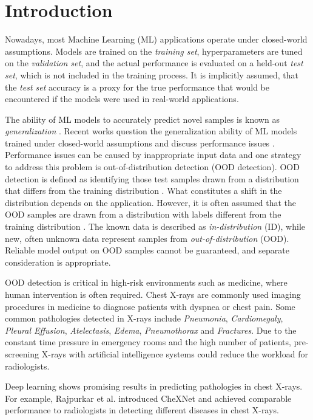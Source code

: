 \section{Introduction}
\raggedbottom
Nowadays, most Machine Learning (ML) applications operate under closed-world assumptions.
Models are trained on the \textit{training set}, hyperparameters are tuned on the \textit{validation set}, and the actual performance is evaluated on a held-out \textit{test set}, which is not included in the training process.
It is implicitly assumed, that the \textit{test set} accuracy is a proxy for the true performance that would be encountered if the models were used in real-world applications.
\par
The ability of ML models to accurately predict novel samples is known as \textit{generalization} \citep{Bishop2006}.
Recent works question the generalization ability of ML models trained under closed-world assumptions and discuss performance issues \citep{Recht2018,Zech2018}.
Performance issues can be caused by inappropriate input data and one strategy to address this problem is out-of-distribution detection (OOD detection).
OOD detection is defined as identifying those test samples drawn from a distribution that differs from the training distribution \citep{Yang2021}.
What constitutes a shift in the distribution depends on the application.
However, it is often assumed that the OOD samples are drawn from a distribution with labels different from the training distribution \citep{Yang2021}.
The known data is described as \textit{in-distribution} (ID), while new, often unknown data represent samples from \textit{out-of-distribution} (OOD).
Reliable model output on OOD samples cannot be guaranteed, and separate consideration is appropriate.
\par
OOD detection is critical in high-risk environments such as medicine, where human intervention is often required.
Chest X-rays are commonly used imaging procedures in medicine to diagnose patients with dyspnea or chest pain.
Some common pathologies detected in X-rays include \textit{Pneumonia}, \textit{Cardiomegaly}, \textit{Pleural Effusion}, \textit{Atelectasis}, \textit{Edema}, \textit{Pneumothorax} and \textit{Fractures}.
Due to the constant time pressure in emergency rooms and the high number of patients, pre-screening X-rays with artificial intelligence systems could reduce the workload for radiologists. 
\par
Deep learning shows promising results in predicting pathologies in chest X-rays.
For example, Rajpurkar et al. \citep{Rajpurkar2017} introduced CheXNet and achieved comparable performance to radiologists in detecting different diseases in chest X-rays.
